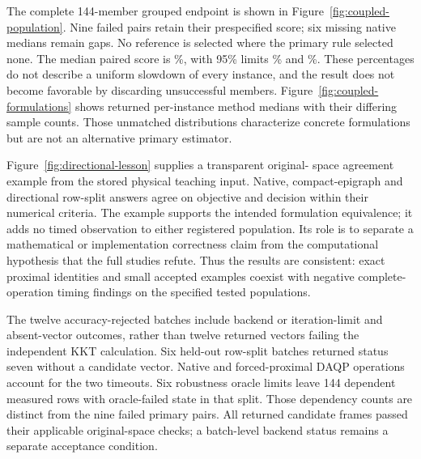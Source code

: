 The complete 144-member grouped endpoint is shown in
Figure~\ref{fig:coupled-population}. Nine failed pairs retain their
prespecified score; six missing native medians remain gaps. No
reference is selected where the primary rule selected none.
The median paired score is \PrimaryEstimate\%, with 95\% limits
\PrimaryLower\% and \PrimaryUpper\%. These percentages do not
describe a uniform slowdown of every instance, and the result
does not become favorable by discarding unsuccessful members.
Figure~\ref{fig:coupled-formulations} shows returned per-instance
method medians with their differing sample counts. Those unmatched
distributions characterize concrete formulations but are not an
alternative primary estimator.



Figure~\ref{fig:directional-lesson} supplies a transparent original-
space agreement example from the stored physical teaching input.
Native, compact-epigraph and directional row-split answers agree
on objective and decision within their numerical criteria. The
example supports the intended formulation equivalence; it adds
no timed observation to either registered population. Its role
is to separate a mathematical or implementation correctness claim
from the computational hypothesis that the full studies refute.
Thus the results are consistent: exact proximal identities and
small accepted examples coexist with negative complete-operation
timing findings on the specified tested populations.

The twelve accuracy-rejected batches include backend or iteration-limit
and absent-vector outcomes, rather than twelve returned vectors failing
the independent KKT calculation. Six held-out row-split batches returned
status seven without a candidate vector. Native and forced-proximal DAQP
operations account for the two timeouts. Six robustness oracle limits
leave 144 dependent measured rows with oracle-failed state in that split.
Those dependency counts are distinct from the nine failed primary pairs.
All returned candidate frames passed their applicable original-space
checks; a batch-level backend status remains a separate acceptance condition.
